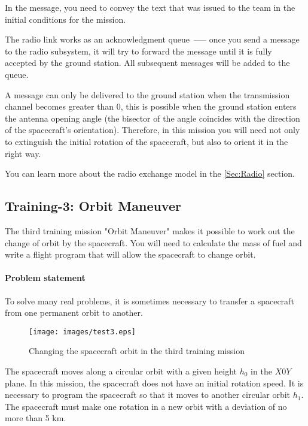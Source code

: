 \documentclass[12pt,a4paper]{article}
\begin{document}
In the message, you need to convey the text that was issued to the team in the initial conditions for the mission.

The radio link works as an acknowledgment queue~--— once you send a message to the radio subsystem, it will try to forward the message until it is fully accepted by the ground station. All subsequent messages will be added to the queue.

A message can only be delivered to the ground station when the transmission channel becomes greater than 0, this is possible when the ground station enters the antenna opening angle (the bisector of the angle coincides with the direction of the spacecraft's orientation). Therefore, in this mission you will need not only to extinguish the initial rotation of the spacecraft, but also to orient it in the right way.

You can learn more about the radio exchange model in the \ref{Sec:Radio} section.

\clearpage
\subsection{Training-3: Orbit Maneuver}
\label{Sec:Maneuver}

The third training mission "Orbit Maneuver" makes it possible to work out the change of orbit by the spacecraft. You will need to calculate the mass of fuel and write a flight program that will allow the spacecraft to change orbit.

\paragraph{Problem statement}

To solve many real problems, it is sometimes necessary to transfer a spacecraft from one permanent orbit to another.

\begin{figure}[tbh]
  \begin{center}
    \texttt{[image: images/test3.eps]}
    \caption{Changing the spacecraft orbit in the third training mission}
    \label{Pic:Test-3}
  \end{center}
\end{figure}

The spacecraft moves along a circular orbit with a given height $h_0$ in the $X0Y$ plane. In this mission, the spacecraft does not have an initial rotation speed. It is necessary to program the spacecraft so that it moves to another circular orbit $h_1$. The spacecraft must make one rotation in a new orbit with a deviation of no more than 5 km.
\end{document}
